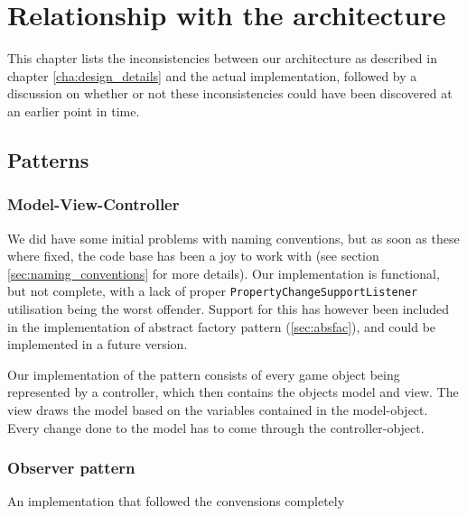 \chapter{Relationship with the architecture}
\label{cha:relationship_with_the_architecture}

This chapter lists the inconsistencies between our architecture as described in chapter \ref{cha:design_details} and the actual implementation, followed by a discussion on whether or not these inconsistencies could have been discovered at an earlier point in time.



\section{Patterns}
\label{sec:patters}

\subsection{Model-View-Controller}
\label{sec:mvc}

We did have some initial problems with naming conventions, but as soon as these where fixed, the code base has been a joy to work with (see section \ref{sec:naming_conventions} for more details).
Our implementation is functional, but not complete, with a lack of proper \texttt{PropertyChangeSupportListener} utilisation being the worst offender. Support for this has however been included in the implementation of abstract factory pattern (\ref{sec:absfac}), and could be implemented in a future version.

Our implementation of the pattern consists of every game object being represented by a controller, which then contains the objects model and view. The view draws the model based on the variables contained in the model-object. Every change done to the model has to come through the controller-object.


\subsection{Observer pattern}

An implementation that followed the convensions completely


